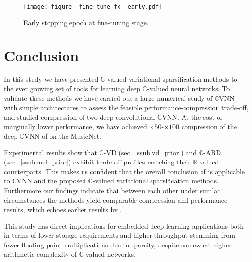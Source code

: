 \documentclass{article}
\newcommand{\real}{\mathbb{R}}
\newcommand{\cplx}{\mathbb{C}}
\begin{document}
\begin{figure}[!t]
  \centering
  \texttt{[image: figure\_\_fine-tune\_fx\_\_early.pdf]}
  \caption{%
    Early stopping epoch at fine-tuning stage.
  }
  \label{fig:musicnet__early_stopping}
\end{figure}



\section{Conclusion} %
\label{sec:conclusion}

In this study we have presented $\cplx$-valued variational sparsification methods to
the ever growing set of tools for learning deep $\cplx$-valued neural networks. To
validate these methods we have carried out a large numerical study of $\cplx$VNN with
simple architectures to assess the feasible performance-compression trade-off, and
studied compression of two deep convolutional $\cplx$VNN. At the cost of marginally
lower performance, we have achieved $\times50$-$\times100$ compression of the deep
$\cplx$VNN of \citet{trabelsi_deep_2018} on the MusicNet.

Experimental results show that $\cplx$-VD (sec.~\ref{ssub:vd_prior}) and $\cplx$-ARD
(sec.~\ref{ssub:ard_prior}) exhibit trade-off profiles matching their $\real$-valued
counterparts. This makes us confident that the overall conclusion of \citet{gale_state_2019}
is applicable to $\cplx$VNN and the proposed $\cplx$-valued variational sparsification
methods.
Furthermore our findings indicate that between each other under similar circumstances
the methods yield comparable compression and performance results, which echoes earlier
results by \citet{kharitonov_variational_2018}.

This study has direct implications for embedded deep learning applications
both in terms of lower storage requirements and higher throughput stemming from fewer
floating point multiplications due to sparsity, despite somewhat higher arithmetic
complexity of $\cplx$-valued networks.
\end{document}
